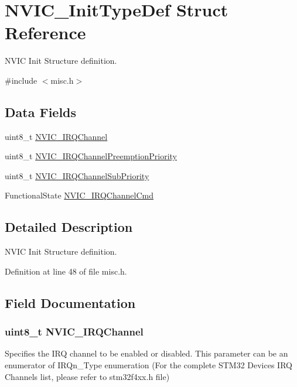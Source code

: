 \hypertarget{struct_n_v_i_c___init_type_def}{\section{N\-V\-I\-C\-\_\-\-Init\-Type\-Def Struct Reference}
\label{struct_n_v_i_c___init_type_def}
}


N\-V\-I\-C Init Structure definition.  




{\ttfamily \#include $<$misc.\-h$>$}

\subsection*{Data Fields}
\begin{DoxyCompactItemize}
\item 
uint8\-\_\-t \hyperlink{struct_n_v_i_c___init_type_def_ae972a759b8b04f3856a614315c03d2d0}{N\-V\-I\-C\-\_\-\-I\-R\-Q\-Channel}
\item 
uint8\-\_\-t \hyperlink{struct_n_v_i_c___init_type_def_aa395d7151e569272cbcf04420a1a4128}{N\-V\-I\-C\-\_\-\-I\-R\-Q\-Channel\-Preemption\-Priority}
\item 
uint8\-\_\-t \hyperlink{struct_n_v_i_c___init_type_def_a91b24559ddbc12752f2414582fb47cb9}{N\-V\-I\-C\-\_\-\-I\-R\-Q\-Channel\-Sub\-Priority}
\item 
Functional\-State \hyperlink{struct_n_v_i_c___init_type_def_a3c5567ef024a0489884083c88f17b4d5}{N\-V\-I\-C\-\_\-\-I\-R\-Q\-Channel\-Cmd}
\end{DoxyCompactItemize}


\subsection{Detailed Description}
N\-V\-I\-C Init Structure definition. 

Definition at line 48 of file misc.\-h.



\subsection{Field Documentation}
\hypertarget{struct_n_v_i_c___init_type_def_ae972a759b8b04f3856a614315c03d2d0}{
\subsubsection[{N\-V\-I\-C\-\_\-\-I\-R\-Q\-Channel}]{\setlength{\rightskip}{0pt plus 5cm}uint8\-\_\-t N\-V\-I\-C\-\_\-\-I\-R\-Q\-Channel}}\label{struct_n_v_i_c___init_type_def_ae972a759b8b04f3856a614315c03d2d0}
Specifies the I\-R\-Q channel to be enabled or disabled. This parameter can be an enumerator of I\-R\-Qn\-\_\-\-Type enumeration (For the complete S\-T\-M32 Devices I\-R\-Q Channels list, please refer to stm32f4xx.\-h file) 

